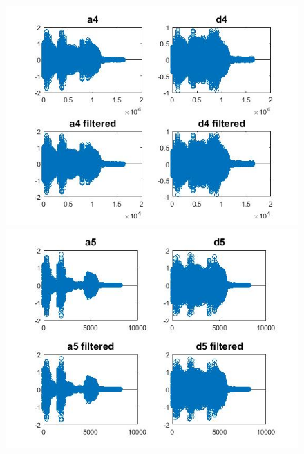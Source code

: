 \documentclass{article}
\begin{document}
\begin{figure}[H]
\includegraphics[scale=.5]{a4d4}
\includegraphics[scale=.5]{a5d5}
\end{figure}
\end{document}

